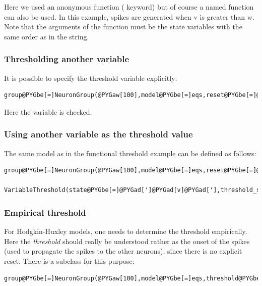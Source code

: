 \documentclass[letterpaper,10pt]{manual}
\begin{document}
Here we used an anonymous function ( keyword) but of course a named function can also
be used. In this example, spikes are generated when v is greater than w.
Note that the arguments of the function must be the state variables with the same order as
in the \hyperlink{brian.Equations}{} string.


\subsubsection{Thresholding another variable}

It is possible to specify the threshold variable explicitly:

\begin{Verbatim}[commandchars=@\[\]]
group@PYGbe[=]NeuronGroup(@PYGaw[100],model@PYGbe[=]eqs,reset@PYGbe[=]@PYGaw[0]@PYGbe[*]mV,threshold@PYGbe[=]Threshold(@PYGaw[0]@PYGbe[*]mV,state@PYGbe[=]@PYGad[']@PYGad[w]@PYGad[']))
\end{Verbatim}

Here the variable  is checked.


\subsubsection{Using another variable as the threshold value}

The same model as in the functional threshold example can be defined as follows:

\begin{Verbatim}[commandchars=@\[\]]
group@PYGbe[=]NeuronGroup(@PYGaw[100],model@PYGbe[=]eqs,reset@PYGbe[=]@PYGaw[0]@PYGbe[*]mV,threshold@PYGbe[=]\
      VariableThreshold(state@PYGbe[=]@PYGad[']@PYGad[v]@PYGad['],threshold_state@PYGbe[=]@PYGad[']@PYGad[w]@PYGad[']))
\end{Verbatim}


\subsubsection{Empirical threshold}

For Hodgkin-Huxley models, one needs to determine the threshold empirically. Here the
\emph{threshold} should really be understood rather as the onset of the spikes (used to propagate
the spikes to the other neurons), since there is no explicit reset. There is a
\hyperlink{brian.Threshold}{\code{Threshold}} subclass for this purpose:

\begin{Verbatim}[commandchars=@\[\]]
group@PYGbe[=]NeuronGroup(@PYGaw[100],model@PYGbe[=]eqs,threshold@PYGbe[=]EmpiricalThreshold(threshold@PYGbe[=]@PYGbe[-]@PYGaw[20]@PYGbe[*]mV,refractory@PYGbe[=]@PYGaw[3]@PYGbe[*]ms))
\end{Verbatim}
\end{document}
